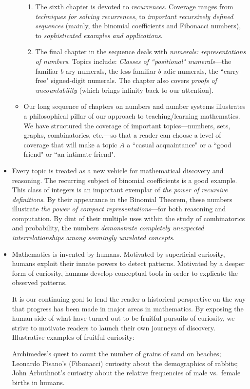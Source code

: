 \documentclass{article}[12pt]
\begin{document}
\begin{itemize}
\begin{itemize}
\begin{enumerate}
  \item
The sixth chapter is devoted to {\em recurrences}.  Coverage ranges from {\em techniques for solving recurrences}, to {\em important recursively defined sequences} (mainly, the binomial coefficients and Fibonacci numbers), to {\em sophisticated examples and applications}.
  \item
The final chapter in the sequence deals with {\em numerals: representations of numbers}.  Topics include: {\em Classes of ``positional" numerals}---the familiar $b$-ary numerals, the less-familiar $b$-adic numerals, the ``carry-free" signed-digit numerals.  The chapter also covers {\em proofs of uncountability} (which brings infinity back to our attention).  
\end{enumerate}

\item
Our long sequence of chapters on numbers and number systems illustrates a philosophical pillar of our approach to teaching/learning mathematics.  We have structured the coverage of important topics---numbers, sets, graphs, combinatorics, etc.---so that a reader can choose a level of coverage that will make a topic $A$ a ``casual acquaintance" or a ``good friend" or ``an intimate friend".
\end{itemize}

\item
Every topic is treated as a new vehicle for mathematical discovery and reasoning.  The recurring subject of binomial coefficients is a good example.  This class of integers is an important exemplar of {\em the power of recursive definitions}.  By their appearance in the Binomial Theorem, these numbers illustrate {\em the power of compact representations}---for both reasoning and computation.  By dint of their multiple uses within the study of combinatorics and probability, the numbers {\em demonstrate completely unexpected interrelationships among seemingly unrelated concepts}.

\item
Mathematics is invented by humans.  Motivated by superficial curiosity, humans exploit their innate powers to detect patterns.  Motivated by a deeper form of curiosity, humans develop conceptual tools in order to explicate the observed patterns.

\smallskip

It is our continuing goal to lend the reader a historical perspective on the way that progress has been made in major areas in mathematics.  By exposing the human side of what have turned out to be fruitful pursuits of curiosity, we strive to motivate readers to launch their own journeys of discovery.  Illustrative examples of fruitful curiosity:

Archimedes's quest to count the number of grains of sand on beaches; Leonardo Pisano's (Fibonacci) curiosity about the demographics of rabbits; John Arbuthnot's curiosity about the relative frequencies of male vs.~female births in humans. 
\end{itemize}
\end{document}
